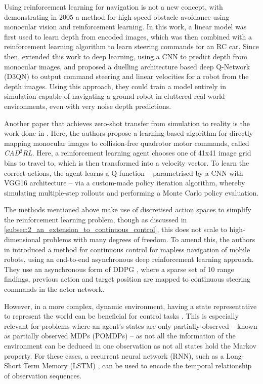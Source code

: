 Using reinforcement learning for navigation is not a new concept, with \cite{highSpeedObstacleAvoidanceMonocularVision2005} demonstrating in 2005 a method for high-speed obstacle avoidance using monocular vision and reinforcement learning. In this work, a linear model was first used to learn depth from encoded images, which was then combined with a reinforcement learning algorithm to learn steering commands for an RC car.
Since then, \cite{TowardsMonocularVisionObstacleAvoidanceDeepRL2017} extended this work to deep learning, using a CNN to predict depth from monocular images, and proposed a duelling architecture based deep Q-Network (D3QN) to output command steering and linear velocities for a robot from the depth images. Using this approach, they could train a model entirely in simulation capable of navigating a ground robot in cluttered real-world environments, even with very noise depth predictions.

Another paper that achieves zero-shot transfer from simulation to reality is the work done in \cite{cad2rl}. Here, the authors propose a learning-based algorithm for directly mapping monocular images to collision-free quadrotor motor commands, called \textit{CAD}$^2$\textit{RL}. Here, a reinforcement learning agent chooses one of 41x41 image grid bins to travel to, which is then transformed into a velocity vector. To learn the correct actions, the agent learns a Q-function -- parametrised by a CNN with VGG16 architecture \cite{vgg16} -- via a custom-made policy iteration algorithm, whereby simulating multiple-step rollouts and performing a Monte Carlo policy evaluation.

The methods mentioned above make use of discretised action spaces to simplify the reinforcement learning problem, though as discussed in \cref{subsec:2_an_extension_to_continuous_control}, this does not scale to high-dimensional problems with many degrees of freedom. To amend this, the authors in \cite{virtualToRealRLContinuousControlForMaplessNavigation} introduced a method for continuous control for mapless navigation of mobile robots, using an end-to-end asynchronous deep reinforcement learning approach. They use an asynchronous form of DDPG \cite{DDPG}, where a sparse set of 10 range findings, previous action and target position are mapped to continuous steering commands in the actor-network.

However, in a more complex, dynamic environment, having a state representative to represent the world can be beneficial for control tasks \cite{stateRepresentation_overview}. This is especially relevant for problems where an agent's states are only partially observed -- known as partially observed MDPs (POMDPs) -- as not all the information of the environment can be deduced in one observation as not all states hold the Markov property. For these cases, a recurrent neural network (RNN), such as a Long-Short Term Memory (LSTM) \cite{LSTM}, can be used to encode the temporal relationship of observation sequences.

